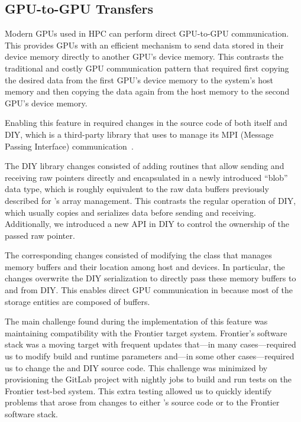 \subsection{GPU-to-GPU Transfers}

Modern GPUs used in HPC can perform direct GPU-to-GPU communication. This provides GPUs with an efficient mechanism to send data stored in their device memory directly to another GPU's device memory. This contrasts the traditional and costly GPU communication pattern that required first copying the desired data from the first GPU's device memory to the system's host memory and then copying the data again from the host memory to the second GPU's device memory.

Enabling this feature in \vtkm required changes in the source code of both \vtkm itself and DIY, which is a third-party library that \vtkm uses to manage its MPI (Message Passing Interface) communication~\citep{Peterka2011,Morozov2016}.

The DIY library changes consisted of adding routines that allow sending and receiving raw pointers directly and encapsulated in a newly introduced ``blob'' data type, which is roughly equivalent to the raw data buffers previously described for \vtkm's array management.
This contrasts the regular operation of DIY, which usually copies and serializes data before sending and receiving.
Additionally, we introduced a new API in DIY to control the ownership of the passed raw pointer.

The corresponding \vtkm changes consisted of modifying the \vtkm class that manages memory buffers and their location among host and devices.
In particular, the changes overwrite the DIY serialization to directly pass these memory buffers to and from DIY.
This enables direct GPU communication in \vtkm because most of the \vtkm storage entities are composed of \vtkm buffers. 

The main challenge found during the implementation of this feature was maintaining compatibility with the Frontier target system.
Frontier's software stack was a moving target with frequent updates that---in many cases---required us to modify build and runtime parameters and---in some other cases---required us to change the \vtkm and DIY source code.
This challenge was minimized by provisioning the \vtkm GitLab project with nightly jobs to build and run tests on the Frontier test-bed system.
This extra testing allowed us to quickly identify problems that arose from changes to either \vtkm's source code or to the Frontier software stack.
